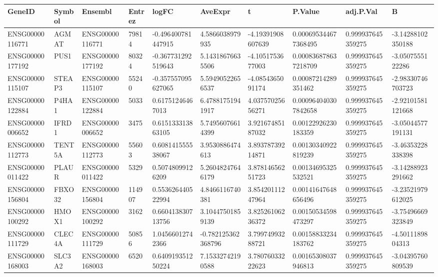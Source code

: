 \begingroup
\tiny
\setlength{\tabcolsep}{2pt}
\renewcommand{\arraystretch}{1.18}
\begin{tabular}{@{}llllllllll@{}}
\toprule
GeneID & Symbol & Ensembl & Entrez & logFC & AveExpr & t & P.Value & adj.P.Val & B \\
\midrule
ENSG00000116771 & AGMAT & ENSG00000116771 & 79814 & -0.496400781447915 & 4.5866038979935 & -4.19391908607639 & 0.000695344677368495 & 0.999937645359275 & -3.14288102350188 \\
ENSG00000177192 & PUS1 & ENSG00000177192 & 80324 & -0.367731292519643 & 5.14318676635506 & -4.1051753677003 & 0.000836878637218709 & 0.999937645359275 & -3.0507555122286 \\
ENSG00000115107 & STEAP3 & ENSG00000115107 & 55240 & -0.357557095627065 & 5.59490522656537 & -4.0854365091174 & 0.00087214289351462 & 0.999937645359275 & -2.98330746703723 \\
ENSG00000122884 & P4HA1 & ENSG00000122884 & 5033 & 0.61751246467013 & 6.47881751941917 & 4.03757025656271 & 0.000964040307842658 & 0.999937645359275 & -2.92101581121668 \\
ENSG00000006652 & IFRD1 & ENSG00000006652 & 3475 & 0.615133313863105 & 5.74956076614399 & 3.92167485187032 & 0.00122926230183359 & 0.999937645359275 & -3.05044577191131 \\
ENSG00000112773 & TENT5A & ENSG00000112773 & 55603 & 0.608141555538067 & 3.9530886474613 & 3.89378739214871 & 0.00130340922819239 & 0.999937645359275 & -3.46353228338398 \\
ENSG00000011422 & PLAUR & ENSG00000011422 & 5329 & 0.50748099126209 & 5.26048247646179 & 3.87814656251723 & 0.00134695325532521 & 0.999937645359275 & -3.14288923291662 \\
ENSG00000156804 & FBXO32 & ENSG00000156804 & 114907 & 0.553626440522994 & 4.8466116740381 & 3.85420111247964 & 0.00141647648656496 & 0.999937645359275 & -3.23521979612025 \\
ENSG00000100292 & HMOX1 & ENSG00000100292 & 3162 & 0.660413830713756 & 3.10447501859139 & 3.82526106236372 & 0.00150534598473297 & 0.999937645359275 & -3.75496669323849 \\
ENSG00000111729 & CLEC4A & ENSG00000111729 & 50856 & 1.04566012742366 & -0.782125362368796 & 3.79974993288721 & 0.00158833234183762 & 0.999937645359275 & -4.5011189804313 \\
ENSG00000168003 & SLC3A2 & ENSG00000168003 & 6520 & 0.640919351250224 & 7.15332742190588 & 3.78076033222623 & 0.00165308037946813 & 0.999937645359275 & -3.04395760809539 \\

\end{tabular}
